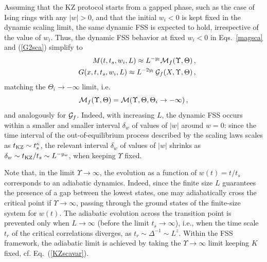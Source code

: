 Assuming that the KZ protocol starts from a gapped phase, such as
the case of Ising rings with any $|w|>0$, and that the initial $w_i<0$
is kept fixed in the dynamic scaling limit, the same dynamic FSS is
expected to hold, irrespective of the value of $w_i$.  Thus, the
dynamic FSS behavior at fixed $w_i<0$ in Eqs.~\eqref{magsca} and
(\ref{G2sca}) simplify to
\begin{eqnarray}
  &&M(t,t_s,w_i,L) \approx L^{-y_l} {\cal M}_f(\Upsilon,\Theta)\,,
  \label{magsca2}\\
    &&G(x,t,t_s,w_i,L) \approx L^{-2y_l}\, {\cal
      G}_f(X,\Upsilon,\Theta)\,,
  \label{G2sca2}
\end{eqnarray}
matching the $\Theta_i\to -\infty$ limit, i.e.
\begin{equation}
{\cal
  M}_f(\Upsilon,\Theta) = {\cal M}(\Upsilon,\Theta,\Theta_i\to
-\infty)\,,
\label{thetaiinf}
\end{equation}
and analogously for ${\cal G}_f$.  Indeed, with increasing $L$, the
dynamic FSS occurs within a smaller and smaller interval $\delta_w$ of
values of $|w|$ around $w=0$: since the time interval of the
out-of-equilibrium process described by the scaling laws scales as
$t_{\rm KZ}\sim t_s^{\kappa}$, the relevant interval $\delta_w$ of
values of $|w|$ shrinks as $ \delta_w \sim {t_{\rm KZ}/t_s}\sim
L^{-y_w}$, when keeping $\Upsilon$ fixed.

Note that, in the limit $\Upsilon\to\infty$, the evolution as a
function of $w(t)=t/t_s$ corresponds to an adiabatic dynamics.
Indeed, since the finite size $L$ guarantees the presence of a gap
between the lowest states, one may adiabatically cross the critical
point if $\Upsilon\to\infty$, passing through the ground states of the
finite-size system for $w(t)$. The adiabatic evolution across the
transition point is prevented only when $L\to\infty$ (before the limit
$t_s\to\infty$), i.e., when the time scale $t_{r}$ of the critical
correlations diverges, as $t_r\sim \Delta^{-1}\sim L^z$.  Within the
FSS framework, the adiabatic limit is achieved by taking the
$\Upsilon\to\infty$ limit keeping $K$ fixed, cf. Eq.~(\ref{KZscavar}).
      

